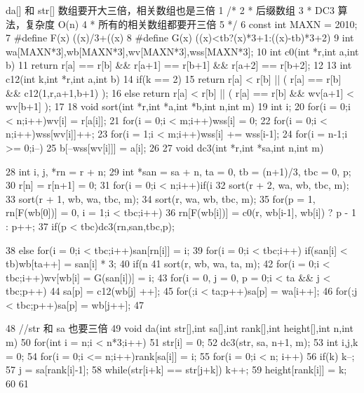 \documentclass[11pt]{article}
\begin{document}
\begin{Code}
     da[] 和 str[] 数组要开大三倍，相关数组也是三倍
 1   /*
 2    * 后缀数组
 3    * DC3 算法，复杂度 O(n)
 4    * 所有的相关数组都要开三倍
 5    */
 6   const int MAXN = 2010;
 7   #define F(x) ((x)/3+((x)%
 8   #define G(x) ((x)<tb?(x)*3+1:((x)-tb)*3+2)
 9   int wa[MAXN*3],wb[MAXN*3],wv[MAXN*3],wss[MAXN*3];
10   int c0(int *r,int a,int b){
11       return r[a] == r[b] && r[a+1] == r[b+1] && r[a+2] == r[b+2];
12   }
13   int c12(int k,int *r,int a,int b){
14       if(k == 2)
15           return r[a] < r[b] || ( r[a] == r[b] && c12(1,r,a+1,b+1) );
16       else return r[a] < r[b] || ( r[a] == r[b] && wv[a+1] < wv[b+1]
            );
17   }
18   void sort(int *r,int *a,int *b,int n,int m){
19       int i;
20       for(i = 0;i < n;i++)wv[i] = r[a[i]];
21       for(i = 0;i < m;i++)wss[i] = 0;
22       for(i = 0;i < n;i++)wss[wv[i]]++;
23       for(i = 1;i < m;i++)wss[i] += wss[i-1];
24       for(i = n-1;i >= 0;i--)
25           b[--wss[wv[i]]] = a[i];
26   }
27   void dc3(int *r,int *sa,int n,int m){
28       int i, j, *rn = r + n;
29       int *san = sa + n, ta = 0, tb = (n+1)/3, tbc = 0, p;
30       r[n] = r[n+1] = 0;
31       for(i = 0;i < n;i++)if(i %
32       sort(r + 2, wa, wb, tbc, m);
33       sort(r + 1, wb, wa, tbc, m);
34       sort(r, wa, wb, tbc, m);
35       for(p = 1, rn[F(wb[0])] = 0, i = 1;i < tbc;i++)
36           rn[F(wb[i])] = c0(r, wb[i-1], wb[i]) ? p - 1 : p++;
37       if(p < tbc)dc3(rn,san,tbc,p);


38         else for(i = 0;i < tbc;i++)san[rn[i]] = i;
39         for(i = 0;i < tbc;i++) if(san[i] < tb)wb[ta++] = san[i] * 3;
40         if(n %
41         sort(r, wb, wa, ta, m);
42         for(i = 0;i < tbc;i++)wv[wb[i] = G(san[i])] = i;
43         for(i = 0, j = 0, p = 0;i < ta && j < tbc;p++)
44             sa[p] = c12(wb[j] %
                  ++];
45         for(;i < ta;p++)sa[p] = wa[i++];
46         for(;j < tbc;p++)sa[p] = wb[j++];
47   }
48   //str 和 sa 也要三倍
49   void da(int str[],int sa[],int rank[],int height[],int n,int m){
50       for(int i = n;i < n*3;i++)
51           str[i] = 0;
52       dc3(str, sa, n+1, m);
53       int i,j,k = 0;
54       for(i = 0;i <= n;i++)rank[sa[i]] = i;
55       for(i = 0;i < n; i++){
56           if(k) k--;
57           j = sa[rank[i]-1];
58           while(str[i+k] == str[j+k]) k++;
59           height[rank[i]] = k;
60       }
61   }
\end{Code}
\end{document}

